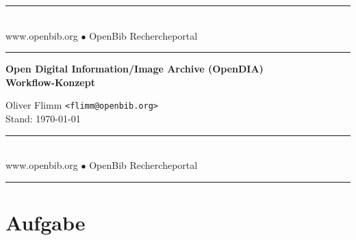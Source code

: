 \documentclass[11pt, twoside, a4paper, BCOR8mm, DIV12, bibtotoc,idxtotoc]{scrreprt}
\begin{document}
\begin{titlepage}

\begin{center}
\rule[-.1in]{16cm}{1mm}\\[3mm]
{\fontsize{20}{20pt}\selectfont
  www.openbib.org $\bullet$ OpenBib Rechercheportal}\\[-2mm]
\rule[-.1in]{16cm}{1mm}

\vspace{5cm}

  \textbf{\fontsize{30}{30pt}\selectfont Open Digital Information/Image Archive (OpenDIA)\\[3mm] Workflow-Konzept}

  \vspace{2cm}

  Oliver Flimm \texttt{<flimm@openbib.org>}\\
  Stand: \today

  \vspace{7cm}

\rule[-.1in]{16cm}{1mm}\\[3mm]
{\fontsize{20}{20pt}\selectfont
  www.openbib.org $\bullet$ OpenBib Rechercheportal}\\[-2mm]
\rule[-.1in]{16cm}{1mm}

\end{center}

\end{titlepage}






\tableofcontents

\chapter{Aufgabe}
\end{document}
